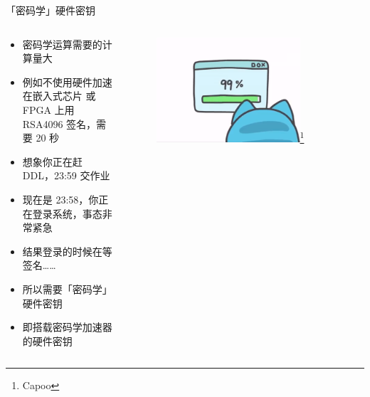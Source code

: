 \documentclass[aspectratio=169]{ctexbeamer}
\begin{document}
\begin{frame}{「密码学」硬件密钥}
  \begin{columns}
    \begin{column}{0.6\textwidth}
      \begin{itemize}
        \item<1-> 密码学运算需要的计算量大
        \item<1-> 例如不使用硬件加速在嵌入式芯片 或 FPGA 上用 RSA4096 签名，需要 20 秒
        \item<2-> 想象你正在赶 DDL，23:59 交作业
        \item<2-> 现在是 23:58，你正在登录系统，事态非常紧急
        \item<2-> 结果登录的时候在等签名……
        \item<3-> 所以需要「密码学」硬件密钥
        \item<3-> 即搭载密码学加速器的硬件密钥
      \end{itemize}
    \end{column}
    \begin{column}{0.4\textwidth}
      \begin{figure}
        \centering
        \includegraphics[width=0.8\textwidth]{img/99.png}\footnote{Capoo}
      \end{figure}
    \end{column}
  \end{columns}
\end{frame}
\end{document}
